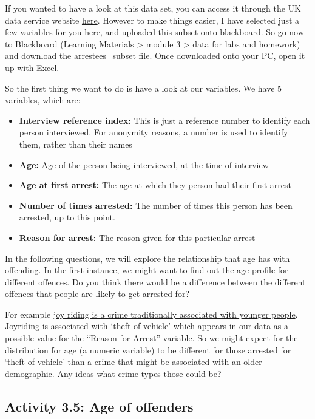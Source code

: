 \documentclass[
]{book}
\providecommand{\tightlist}{%
  \setlength{\itemsep}{0pt}\setlength{\parskip}{0pt}}
\begin{document}
If you wanted to have a look at this data set, you can access it through the UK data service website \href{https://discover.ukdataservice.ac.uk/catalogue/?sn=5807}{here}. However to make things easier, I have selected just a few variables for you here, and uploaded this subset onto blackboard. So go now to Blackboard (Learning Materials \textgreater{} module 3 \textgreater{} data for labs and homework) and download the arrestees\_subset file. Once downloaded onto your PC, open it up with Excel.

So the first thing we want to do is have a look at our variables. We have 5 variables, which are:

\begin{itemize}
\tightlist
\item
  \textbf{Interview reference index:} This is just a reference number to identify each person interviewed. For anonymity reasons, a number is used to identify them, rather than their names\\
\item
  \textbf{Age:} Age of the person being interviewed, at the time of interview
\item
  \textbf{Age at first arrest:} The age at which they person had their first arrest\\
\item
  \textbf{Number of times arrested:} The number of times this person has been arrested, up to this point.
\item
  \textbf{Reason for arrest:} The reason given for this particular arrest
\end{itemize}

In the following questions, we will explore the relationship that age has with offending. In the first instance, we might want to find out the age profile for different offences. Do you think there would be a difference between the different offences that people are likely to get arrested for?

For example \href{http://www.tandfonline.com/doi/abs/10.1080/10683160512331316343}{joy riding is a crime traditionally associated with younger people}. Joyriding is associated with `theft of vehicle' which appears in our data as a possible value for the ``Reason for Arrest'' variable. So we might expect for the distribution for age (a numeric variable) to be different for those arrested for `theft of vehicle' than a crime that might be associated with an older demographic. Any ideas what crime types those could be?

\hypertarget{activity-3.5-age-of-offenders}{%
\subsection{Activity 3.5: Age of offenders}\label{activity-3.5-age-of-offenders}}
\end{document}
